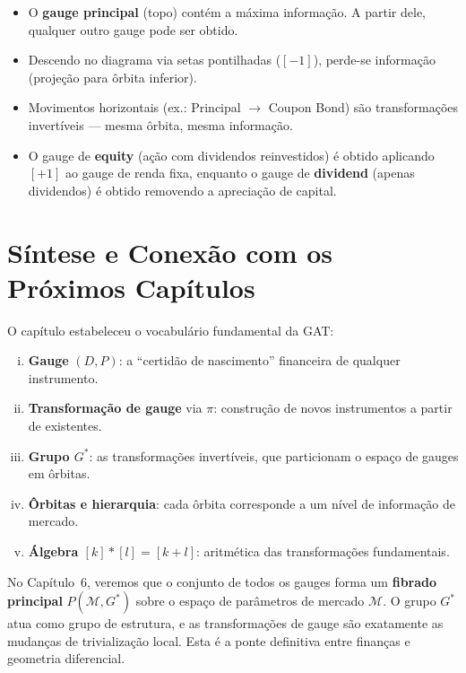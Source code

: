\begin{obs}
\begin{itemize}[nosep]
 \item O \textbf{gauge principal} (topo) cont\'em a m\'axima
 informa\c{c}\~ao. A partir dele, qualquer outro gauge pode
 ser obtido.
 \item Descendo no diagrama via setas pontilhadas ($[-1]$), perde-se
 informa\c{c}\~ao (proje\c{c}\~ao para \^orbita inferior).
 \item Movimentos horizontais (ex.: Principal $\to$ Coupon Bond)
 s\~ao transforma\c{c}\~oes invert\'iveis --- mesma \^orbita,
 mesma informa\c{c}\~ao.
 \item O gauge de \textbf{equity} (a\c{c}\~ao com dividendos
 reinvestidos) \'e obtido aplicando $[+1]$ ao gauge de renda
 fixa, enquanto o gauge de \textbf{dividend} (apenas dividendos)
 \'e obtido removendo a aprecia\c{c}\~ao de capital.
\end{itemize}
\end{obs}

\section{S\'intese e Conex\~ao com os Pr\'oximos Cap\'itulos}

O cap\'itulo estabeleceu o vocabul\'ario fundamental da GAT:

\begin{enumerate}[(i)]
 \item \textbf{Gauge} $(D,P)$: a ``certid\~ao de nascimento''
 financeira de qualquer instrumento.
 \item \textbf{Transforma\c{c}\~ao de gauge} via $\pi$: constru\c{c}\~ao
 de novos instrumentos a partir de existentes.
 \item \textbf{Grupo $G^*$}: as transforma\c{c}\~oes invert\'iveis,
 que particionam o espa\c{c}o de gauges em \^orbitas.
 \item \textbf{\^Orbitas e hierarquia}: cada \^orbita corresponde a
 um n\'ivel de informa\c{c}\~ao de mercado.
 \item \textbf{\'Algebra $[k]*[l] = [k+l]$}: aritm\'etica das
 transforma\c{c}\~oes fundamentais.
\end{enumerate}

No Cap\'itulo~6, veremos que o conjunto de todos os gauges forma um
\textbf{fibrado principal} $P(\mathcal{M}, G^*)$ sobre o espa\c{c}o de
par\^ametros de mercado $\mathcal{M}$. O grupo $G^*$ atua como grupo
de estrutura, e as transforma\c{c}\~oes de gauge s\~ao exatamente as
mudan\c{c}as de trivializa\c{c}\~ao local. Esta \'e a ponte
definitiva entre finan\c{c}as e geometria diferencial.

